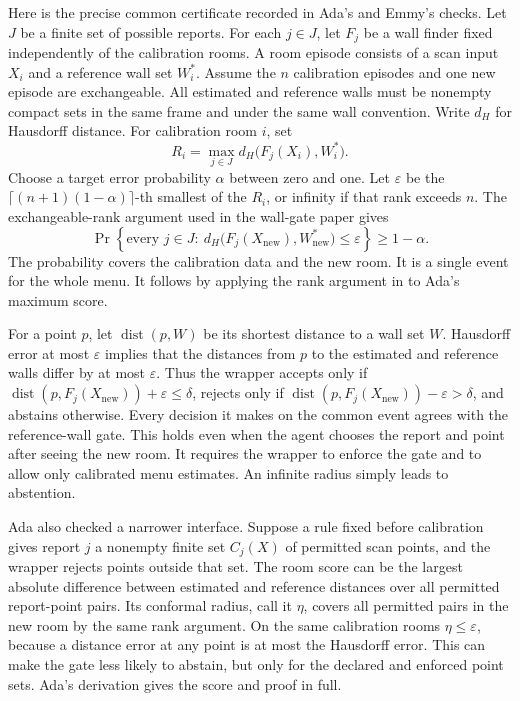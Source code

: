 \documentclass{article}
\begin{document}
Here is the precise common certificate recorded in Ada's and Emmy's checks. Let \(J\) be a finite
set of possible reports. For each \(j\in J\), let \(F_j\) be a wall finder fixed independently of
the calibration rooms. A room episode consists of a scan input \(X_i\) and a reference wall set
\(W_i^*\). Assume the \(n\) calibration episodes and one new episode are exchangeable. All estimated
and reference walls must be nonempty compact sets in the same frame and under the same wall
convention. Write \(d_H\) for Hausdorff distance. For calibration room \(i\), set
\[
R_i=\max_{j\in J}d_H\bigl(F_j(X_i),W_i^*\bigr).
\]
Choose a target error probability \(\alpha\) between zero and one. Let \(\varepsilon\) be the
\(\lceil(n+1)(1-\alpha)\rceil\)-th smallest of the \(R_i\), or infinity if that rank exceeds \(n\).
The exchangeable-rank argument used in the wall-gate paper gives
\[
\Pr\!\left\{\text{every }j\in J:\
d_H\bigl(F_j(X_{\mathrm{new}}),W_{\mathrm{new}}^*\bigr)
\leq\varepsilon\right\}\geq 1-\alpha.
\]
The probability covers the calibration data and the new room. It is a single event for the whole
menu. It follows by applying the rank argument in \cite{P} to Ada's maximum score.

For a point \(p\), let \(\operatorname{dist}(p,W)\) be its shortest distance to a wall set \(W\).
Hausdorff error at most \(\varepsilon\) implies that the distances from \(p\) to the estimated and
reference walls differ by at most \(\varepsilon\). Thus the wrapper accepts only if
\(\operatorname{dist}(p,F_j(X_{\mathrm{new}}))+\varepsilon\leq\delta\), rejects only if
\(\operatorname{dist}(p,F_j(X_{\mathrm{new}}))-\varepsilon>\delta\), and abstains otherwise. Every
decision it makes on the common event agrees with the reference-wall gate. This holds even when the
agent chooses the report and point after seeing the new room. It requires the wrapper to enforce the
gate and to allow only calibrated menu estimates. An infinite radius simply leads to abstention.

Ada also checked a narrower interface. Suppose a rule fixed before calibration gives report \(j\) a
nonempty finite set \(C_j(X)\) of permitted scan points, and the wrapper rejects points outside that
set. The room score can be the largest absolute difference between estimated and reference distances
over all permitted report-point pairs. Its conformal radius, call it \(\eta\), covers all permitted
pairs in the new room by the same rank argument. On the same calibration rooms
\(\eta\leq\varepsilon\), because a distance error at any point is at most the Hausdorff error. This
can make the gate less likely to abstain, but only for the declared and enforced point sets. Ada's
derivation gives the score and proof in full.
\end{document}

